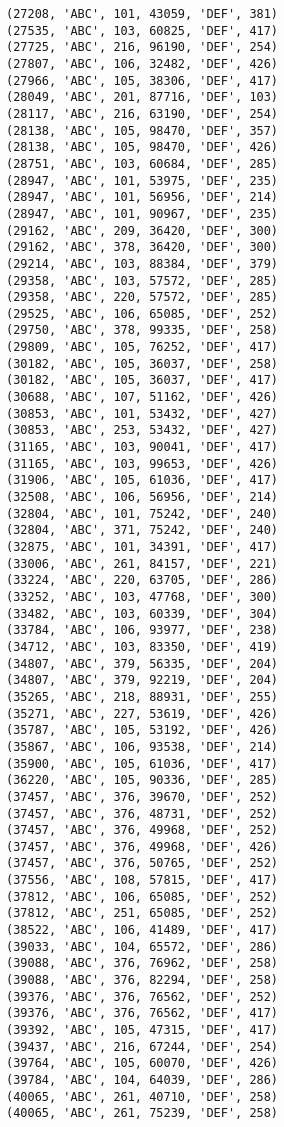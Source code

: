 \begin{verbatim}
(27208, 'ABC', 101, 43059, 'DEF', 381)
(27535, 'ABC', 103, 60825, 'DEF', 417)
(27725, 'ABC', 216, 96190, 'DEF', 254)
(27807, 'ABC', 106, 32482, 'DEF', 426)
(27966, 'ABC', 105, 38306, 'DEF', 417)
(28049, 'ABC', 201, 87716, 'DEF', 103)
(28117, 'ABC', 216, 63190, 'DEF', 254)
(28138, 'ABC', 105, 98470, 'DEF', 357)
(28138, 'ABC', 105, 98470, 'DEF', 426)
(28751, 'ABC', 103, 60684, 'DEF', 285)
(28947, 'ABC', 101, 53975, 'DEF', 235)
(28947, 'ABC', 101, 56956, 'DEF', 214)
(28947, 'ABC', 101, 90967, 'DEF', 235)
(29162, 'ABC', 209, 36420, 'DEF', 300)
(29162, 'ABC', 378, 36420, 'DEF', 300)
(29214, 'ABC', 103, 88384, 'DEF', 379)
(29358, 'ABC', 103, 57572, 'DEF', 285)
(29358, 'ABC', 220, 57572, 'DEF', 285)
(29525, 'ABC', 106, 65085, 'DEF', 252)
(29750, 'ABC', 378, 99335, 'DEF', 258)
(29809, 'ABC', 105, 76252, 'DEF', 417)
(30182, 'ABC', 105, 36037, 'DEF', 258)
(30182, 'ABC', 105, 36037, 'DEF', 417)
(30688, 'ABC', 107, 51162, 'DEF', 426)
(30853, 'ABC', 101, 53432, 'DEF', 427)
(30853, 'ABC', 253, 53432, 'DEF', 427)
(31165, 'ABC', 103, 90041, 'DEF', 417)
(31165, 'ABC', 103, 99653, 'DEF', 426)
(31906, 'ABC', 105, 61036, 'DEF', 417)
(32508, 'ABC', 106, 56956, 'DEF', 214)
(32804, 'ABC', 101, 75242, 'DEF', 240)
(32804, 'ABC', 371, 75242, 'DEF', 240)
(32875, 'ABC', 101, 34391, 'DEF', 417)
(33006, 'ABC', 261, 84157, 'DEF', 221)
(33224, 'ABC', 220, 63705, 'DEF', 286)
(33252, 'ABC', 103, 47768, 'DEF', 300)
(33482, 'ABC', 103, 60339, 'DEF', 304)
(33784, 'ABC', 106, 93977, 'DEF', 238)
(34712, 'ABC', 103, 83350, 'DEF', 419)
(34807, 'ABC', 379, 56335, 'DEF', 204)
(34807, 'ABC', 379, 92219, 'DEF', 204)
(35265, 'ABC', 218, 88931, 'DEF', 255)
(35271, 'ABC', 227, 53619, 'DEF', 426)
(35787, 'ABC', 105, 53192, 'DEF', 426)
(35867, 'ABC', 106, 93538, 'DEF', 214)
(35900, 'ABC', 105, 61036, 'DEF', 417)
(36220, 'ABC', 105, 90336, 'DEF', 285)
(37457, 'ABC', 376, 39670, 'DEF', 252)
(37457, 'ABC', 376, 48731, 'DEF', 252)
(37457, 'ABC', 376, 49968, 'DEF', 252)
(37457, 'ABC', 376, 49968, 'DEF', 426)
(37457, 'ABC', 376, 50765, 'DEF', 252)
(37556, 'ABC', 108, 57815, 'DEF', 417)
(37812, 'ABC', 106, 65085, 'DEF', 252)
(37812, 'ABC', 251, 65085, 'DEF', 252)
(38522, 'ABC', 106, 41489, 'DEF', 417)
(39033, 'ABC', 104, 65572, 'DEF', 286)
(39088, 'ABC', 376, 76962, 'DEF', 258)
(39088, 'ABC', 376, 82294, 'DEF', 258)
(39376, 'ABC', 376, 76562, 'DEF', 252)
(39376, 'ABC', 376, 76562, 'DEF', 417)
(39392, 'ABC', 105, 47315, 'DEF', 417)
(39437, 'ABC', 216, 67244, 'DEF', 254)
(39764, 'ABC', 105, 60070, 'DEF', 426)
(39784, 'ABC', 104, 64039, 'DEF', 286)
(40065, 'ABC', 261, 40710, 'DEF', 258)
(40065, 'ABC', 261, 75239, 'DEF', 258)

\end{verbatim}
